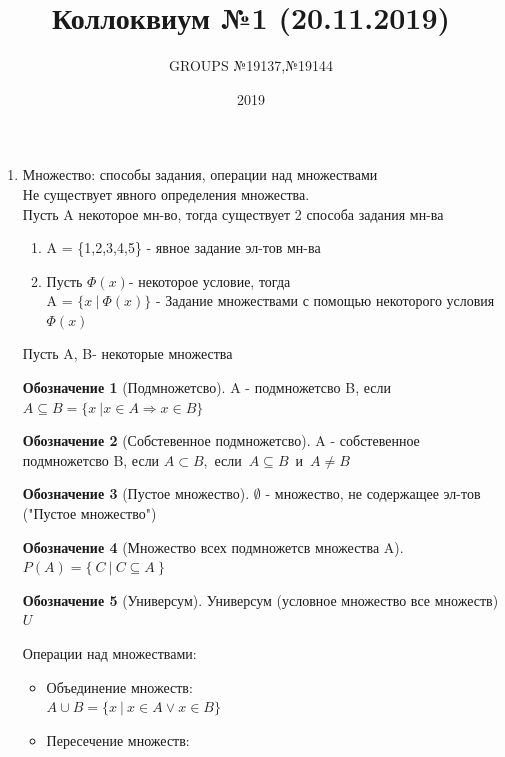 \documentclass[a4paper]{article}
\title{ Коллоквиум №1 (20.11.2019) }
\author{GROUPS №19137,№19144}
\date{2019\\}
\theoremstyle{definition}
\newtheorem*{name}{Обозначение}
\begin{document}
\maketitle
\begin{enumerate}
 \item Множество: способы задания, операции над множествами
       \\ Не существует явного определения множества.
       \\ Пусть A некоторое мн-во, тогда существует 2 способа задания мн-ва
       \begin{enumerate}
        \item A = \{1,2,3,4,5\} - явное задание эл-тов мн-ва \\
        \item Пусть $\Phi(x)$- некоторое условие, тогда \\A = $\{x \ | \ \Phi(x) \}$ - Задание множествами с помощью некоторого условия $\Phi(x)$
       \end{enumerate}
       Пусть A, B- некоторые множества \\
       \begin{name}[Подмножетсво]
        A - подмножетсво B, если\\
        \mbox{$A \subseteq B = \{x \ | x\in{A} \Rightarrow x\in{B} \}$}
       \end{name}
       \begin{name}[Собстевенное подмножетсво]
        A - собстевенное подмножетсво B, если
        \mbox{$A \subset B$, если $A \subseteq B$ и $A\ne{B} $}
       \end{name}
       \begin{name}[Пустое множество]
        $\emptyset$ - множество, не содержащее эл-тов ("Пустое множество")
       \end{name}
       \begin{name}[Множество всех подмножетсв множества A]
        \mbox{}\\
        \mbox{$P(A) = \{ \ C\ |\ C \subseteq{A} \ \} $}
       \end{name}
       \begin{name}[Универсум]
        Универсум (условное множество все множеств) $U$
       \end{name}
       Операции над множествами:
       \begin{itemize}
        \item Объединение множеств:
              \\ $A\cup{B} = \{ x \ | \ x \in{A} \lor x\in{B}\}$
        \item Пересечение множеств:

\end{itemize}
\end{enumerate}
\end{document}
